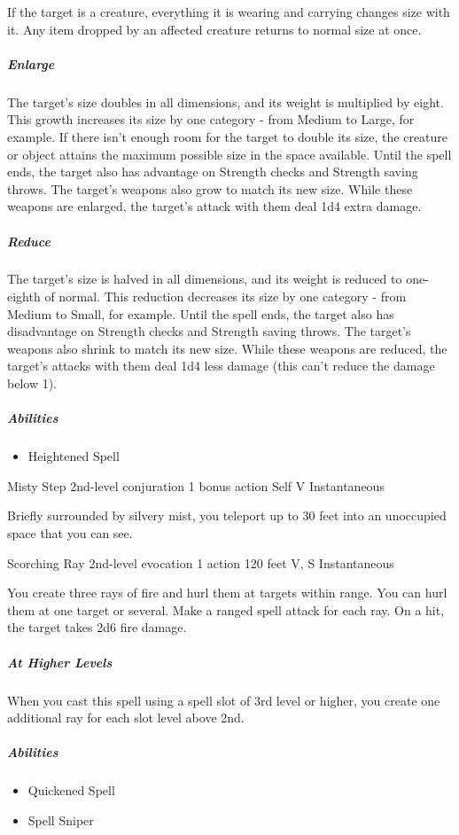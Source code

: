 \documentclass[a4paper,openany,twocolumn]{book}
\begin{document}
If the target is a creature, everything it is wearing and carrying changes size with it. Any item dropped by an affected creature returns to normal size at once. 
    
\subparagraph*{Enlarge} The target’s size doubles in all dimensions, and its weight is multiplied by eight. This growth increases its size by one category - from Medium to Large, for example. If there isn't enough room for the target to double its size, the creature or object attains the maximum possible size in the space available. Until the spell ends, the target also has advantage on Strength checks and Strength saving throws. The target's weapons also grow to match its new size. While these weapons are enlarged, the target's attack with them deal 1d4 extra damage. 
    
\subparagraph*{Reduce} The target’s size is halved in all dimensions, and its weight is reduced to one-eighth of normal. This reduction decreases its size by one category - from Medium to Small, for example. Until the spell ends, the target also has disadvantage on Strength checks and Strength saving throws. The target's weapons also shrink to match its new size. While these weapons are reduced, the target's attacks with them deal 1d4 less damage (this can't reduce the damage below 1).

\subparagraph*{Abilities}
\begin{itemize}
  \item Heightened Spell
\end{itemize}

\DndSpellHeader
  {Misty Step}
  {2nd-level conjuration}
  {1 bonus action}
  {Self}
  {V}
  {Instantaneous}

Briefly surrounded by silvery mist, you teleport up to 30 feet into an unoccupied space that you can see.

\DndSpellHeader
  {Scorching Ray}
  {2nd-level evocation}
  {1 action}
  {120 feet}
  {V, S}
  {Instantaneous}

You create three rays of fire and hurl them at targets within range. You can hurl them at one target or several. Make a ranged spell attack for each ray. On a hit, the target takes 2d6 fire damage.
    
\subparagraph*{At Higher Levels} When you cast this spell using a spell slot of 3rd level or higher, you create one additional ray for each slot level above 2nd.

\subparagraph*{Abilities}
\begin{itemize}
  \item Quickened Spell
  \item Spell Sniper
\end{itemize}
\end{document}

